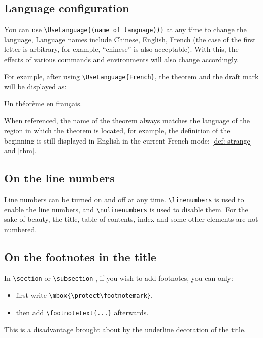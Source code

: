 \documentclass{minimart}
\begin{document}
\subsection{Language configuration}
You can use \lstinline|\UseLanguage{(name of language))}| at any time to change the language, Language names include Chinese, English, French (the case of the first letter is arbitrary, for example, ``chinese'' is also acceptable). With this, the effects of various commands and environments will also change accordingly.

For example, after using \lstinline|\UseLanguage{French}|, the theorem and the draft mark will be displayed as:

\begin{theorem}[Inutile]\label{thm}
    Un théorème en français. \dnf
\end{theorem}

When referenced, the name of the theorem always matches the language of the region in which the theorem is located, for example, the definition of the beginning is still displayed in English in the current French mode: \cref{def: strange} and \cref{thm}. 


\subsection{On the line numbers}
Line numbers can be turned on and off at any time. \lstinline|\linenumbers| is used to enable the line numbers, and \lstinline|\nolinenumbers| is used to disable them. For the sake of beauty, the title, table of contents, index and some other elements are not numbered.

\subsection{On the footnotes in the title}
In \lstinline|\section| or \lstinline|\subsection| , if you wish to add footnotes, you can only:
\begin{itemize}
    \item first write \lstinline|\mbox{\protect\footnotemark}|, 
    \item then add \lstinline|\footnotetext{...}| afterwards. 
\end{itemize}
This is a disadvantage brought about by the underline decoration of the title.
\end{document}
